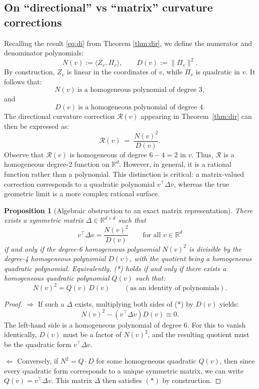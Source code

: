 \documentclass[pdflatex,sn-mathphys-num]{sn-jnl}%
\theoremstyle{thmstyleone}%
\newtheorem{proposition}[theorem]{Proposition}%
\theoremstyle{thmstyletwo}%
\theoremstyle{thmstylethree}%
\begin{document}
\subsection{On ``directional'' vs ``matrix'' curvature corrections}
\label{sec:dm}
Recalling the result \eqref{eq:di} from Theorem \ref{thm:dir}, we define the numerator and denominator polynomials:
\[
N(v) := \langle Z_v,\Pi_v\rangle,\qquad D(v) := \|\Pi_v\|^2.
\]
By construction, \(Z_v\) is linear in the coordinates of \(v\), while \(\Pi_v\) is quadratic in \(v\). It follows that:
\[
N(v)\ \text{is a homogeneous polynomial of degree } 3,\] and \[D(v)\ \text{is a homogeneous polynomial of degree } 4.
\]
The directional curvature correction \(\mathcal R(v)\) appearing in Theorem~\ref{thm:dir} can then be expressed as:
\[
\mathcal R(v) \:=\; \frac{N(v)^2}{D(v)}.
\]
Observe that \(\mathcal R(v)\) is homogeneous of degree \(6-4=2\) in \(v\). Thus, \(\mathcal R\) is a homogeneous degree-2 function on \(\mathbb{R}^d\). However, in general, it is a rational function rather than a polynomial. This distinction is critical: a matrix-valued correction corresponds to a quadratic polynomial \(v^\top \Delta v\), whereas the true geometric limit is a more complex rational surface.


\begin{proposition}[Algebraic obstruction to an exact matrix representation]
There exists a symmetric matrix \(\Delta \in \mathbb{R}^{d\times d}\) such that
\[
v^\top \Delta v = \frac{N(v)^2}{D(v)} \qquad \text{for all } v \in \mathbb{R}^d
\tag{*}
\]
if and only if the degree-6 homogeneous polynomial \(N(v)^2\) is divisible by the degree-4 homogeneous polynomial \(D(v)\), with the quotient being a homogeneous quadratic polynomial. Equivalently, (*) holds if and only if there exists a homogeneous quadratic polynomial \(Q(v)\) such that:
\[
N(v)^2 = Q(v)\,D(v) \qquad (\text{as an identity of polynomials}).
\]
\label{prop:alg}
\end{proposition}

\begin{proof}
\(\Rightarrow\) If such a \(\Delta\) exists, multiplying both sides of (*) by \(D(v)\) yields:
\[
N(v)^2 - (v^\top \Delta v) D(v) \equiv 0.
\]
The left-hand side is a homogeneous polynomial of degree \(6\). For this to vanish identically, \(D(v)\) must be a factor of \(N(v)^2\), and the resulting quotient must be the quadratic form \(v^\top \Delta v\).

\(\Leftarrow\) Conversely, if \(N^2 = Q \cdot D\) for some homogeneous quadratic \(Q(v)\), then since every quadratic form corresponds to a unique symmetric matrix, we can write \(Q(v) = v^\top \Delta v\). This matrix \(\Delta\) then satisfies \((*)\) by construction.
\end{proof}
\end{document}
